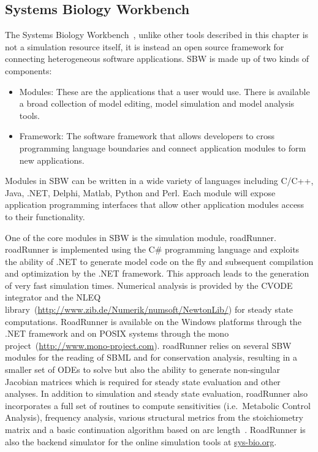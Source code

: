 \documentclass[12pt]{article}
\begin{document}
\subsection{Systems Biology Workbench}

The Systems Biology Workbench~\citep{Sauro:Omics,BergmannCP:2006},
unlike other tools described in this chapter is not a simulation
resource itself, it is instead an open source framework for
connecting heterogeneous software applications. SBW is made up of
two kinds of components:

\begin{itemize}
\item Modules: These are the applications that a user would use. There is available a broad collection of
model editing, model simulation and model analysis tools.
\item Framework: The software framework that allows developers to cross programming language boundaries and
connect application modules to form new applications.
\end{itemize}

Modules in SBW can be written in a wide variety of languages
including C/C++, Java, .NET, Delphi, Matlab, Python and Perl. Each
module will expose application programming interfaces that allow
other application modules access to their functionality.

One of the core modules in SBW is the simulation module, roadRunner.
roadRunner is implemented using the C\# programming language and
exploits the ability of .NET to generate model code on the fly and
subsequent compilation and optimization by the .NET framework. This
approach leads to the generation of very fast simulation times.
Numerical analysis is provided by the CVODE~\citep{CVODE:2005}
integrator and the NLEQ
library~(\url{http://www.zib.de/Numerik/numsoft/NewtonLib/}) for
steady state computations. RoadRunner is available on the Windows
platforms through the .NET framework and on POSIX systems through
the mono project~(\url{http://www.mono-project.com}). roadRunner
relies on several SBW modules for the reading of SBML and for
conservation analysis, resulting in a smaller set of ODEs to solve
but also the ability to generate non-singular Jacobian matrices
which is required for steady state evaluation and other analyses. In
addition to simulation and steady state evaluation, roadRunner also
incorporates a full set of routines to compute sensitivities (i.e.\
Metabolic Control Analysis), frequency analysis, various structural
metrics from the stoichiometry matrix and a basic continuation
algorithm based on arc length~\citep{Kub76,Kub83}. RoadRunner is also the backend simulator for the
online simulation tools at \url{sys-bio.org}.
\end{document}
